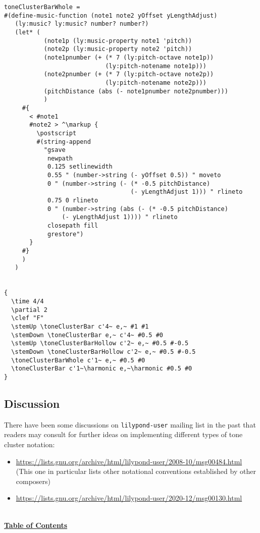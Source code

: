 \documentclass[11pt, oneside]{book}   	%
\begin{document}
\begin{verbatim}
toneClusterBarWhole =
#(define-music-function (note1 note2 yOffset yLengthAdjust)
   (ly:music? ly:music? number? number?)
   (let* (
           (note1p (ly:music-property note1 'pitch))
           (note2p (ly:music-property note2 'pitch))
           (note1pnumber (+ (* 7 (ly:pitch-octave note1p))
                            (ly:pitch-notename note1p)))
           (note2pnumber (+ (* 7 (ly:pitch-octave note2p))
                            (ly:pitch-notename note2p)))
           (pitchDistance (abs (- note1pnumber note2pnumber)))
           )
     #{
       < #note1
       #note2 > ^\markup {
         \postscript
         #(string-append
           "gsave
            newpath
            0.125 setlinewidth
            0.55 " (number->string (- yOffset 0.5)) " moveto
            0 " (number->string (- (* -0.5 pitchDistance)
                                   (- yLengthAdjust 1))) " rlineto
            0.75 0 rlineto
            0 " (number->string (abs (- (* -0.5 pitchDistance)
                (- yLengthAdjust 1)))) " rlineto
            closepath fill
            grestore")
       }
     #}
     )
   )


{
  \time 4/4
  \partial 2
  \clef "F"
  \stemUp \toneClusterBar c'4~ e,~ #1 #1
  \stemDown \toneClusterBar e,~ c'4~ #0.5 #0
  \stemUp \toneClusterBarHollow c'2~ e,~ #0.5 #-0.5
  \stemDown \toneClusterBarHollow c'2~ e,~ #0.5 #-0.5
  \toneClusterBarWhole c'1~ e,~ #0.5 #0
  \toneClusterBar c'1~\harmonic e,~\harmonic #0.5 #0
}
\end{verbatim}
\subsection{Discussion}
There have been some discussions on \verb|lilypond-user| mailing list in the past that readers may consult for further ideas on implementing different types of tone cluster notation: 
\begin{itemize}
\item \url{https://lists.gnu.org/archive/html/lilypond-user/2008-10/msg00484.html} (This one in particular lists other notational conventions established by other composers)
\item \url{https://lists.gnu.org/archive/html/lilypond-user/2020-12/msg00130.html}

\end{itemize}
\hyperref[sec:toc]{\\ \textbf{Table of Contents}}

\clearpage
\end{document}
